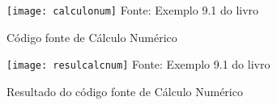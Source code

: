 \begin{figure}[H]
	\begin{center}
	\caption{C\'{o}digo fonte de C\'{a}lculo Num\'{e}rico} \label{calculonum}
	\texttt{[image: calculonum]} 
	\newline
	Fonte: Exemplo 9.1 do livro
	\end{center}
\end{figure}

\begin{figure}[H]
	\begin{center}
	\caption{Resultado do c\'{o}digo fonte de C\'{a}lculo Num\'{e}rico} \label{resulcalcnum}
	\texttt{[image: resulcalcnum]} 
	\newline
	Fonte: Exemplo 9.1 do livro
	\end{center}
\end{figure}